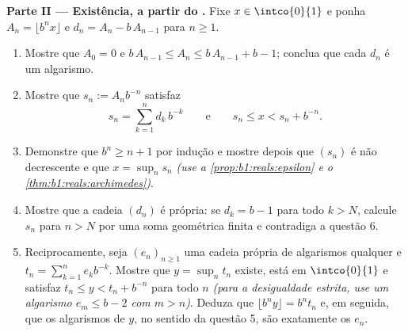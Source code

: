 \begin{problem}
\medskip
\noindent\textbf{Parte II --- Existência, a partir do .} Fixe
$x \in \intco{0}{1}$ e ponha $A_n = \lfloor b^n x \rfloor$ e
$d_n = A_n - b\,A_{n-1}$ para $n \geq 1$.
\begin{enumerate}
  \item Mostre que $A_0 = 0$ e $b\,A_{n-1} \leq A_n \leq b\,A_{n-1} +
        b - 1$; conclua que cada $d_n$ é um algarismo.
  \item Mostre que $s_n := A_n b^{-n}$ satisfaz
        \[
        s_n = \sum_{k=1}^{n} d_k\,b^{-k}
        \qquad\text{e}\qquad
        s_n \leq x < s_n + b^{-n} .
        \]
  \item Demonstre que $b^n \geq n + 1$ por indução e mostre depois que
        $(s_n)$ é não decrescente e que $x = \sup_n s_n$
        \emph{(use a \cref{prop:b1:reals:epsilon} e o
        \cref{thm:b1:reals:archimedes})}.
  \item Mostre que a cadeia $(d_n)$ é própria: se $d_k = b - 1$
        para todo $k > N$, calcule $s_n$ para $n > N$ por uma soma
        geométrica finita e contradiga a questão 6.
  \item Reciprocamente, seja $(e_n)_{n \geq 1}$ uma cadeia própria de
        algarismos qualquer e $t_n = \sum_{k=1}^n e_k b^{-k}$. Mostre que $y
        = \sup_n t_n$ existe, está em $\intco{0}{1}$ e
        satisfaz $t_n \leq y < t_n + b^{-n}$ para todo $n$
        \emph{(para a desigualdade estrita, use um algarismo $e_m \leq b
        - 2$ com $m > n$)}. Deduza que $\lfloor b^n y \rfloor = b^n
        t_n$ e, em seguida, que os algarismos de $y$, no sentido da
        questão 5, são exatamente os $e_n$.
\end{enumerate}


\end{problem}
